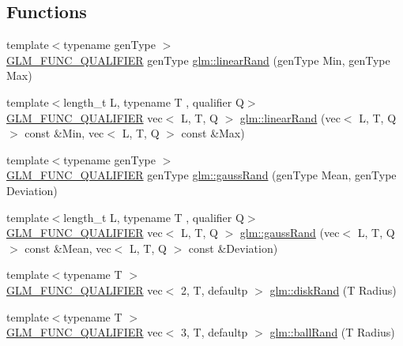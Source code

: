 \subsection*{Functions}
\begin{DoxyCompactItemize}
\item 
{\footnotesize template$<$typename gen\+Type $>$ }\\\hyperlink{setup_8hpp_a33fdea6f91c5f834105f7415e2a64407}{G\+L\+M\+\_\+\+F\+U\+N\+C\+\_\+\+Q\+U\+A\+L\+I\+F\+I\+ER} gen\+Type \hyperlink{group__gtc__random_ga04e241ab88374a477a2c2ceadd2fa03d}{glm\+::linear\+Rand} (gen\+Type Min, gen\+Type Max)
\item 
{\footnotesize template$<$length\+\_\+t L, typename T , qualifier Q$>$ }\\\hyperlink{setup_8hpp_a33fdea6f91c5f834105f7415e2a64407}{G\+L\+M\+\_\+\+F\+U\+N\+C\+\_\+\+Q\+U\+A\+L\+I\+F\+I\+ER} vec$<$ L, T, Q $>$ \hyperlink{group__gtc__random_ga94731130c298a9ff5e5025fdee6d97a0}{glm\+::linear\+Rand} (vec$<$ L, T, Q $>$ const \&Min, vec$<$ L, T, Q $>$ const \&Max)
\item 
{\footnotesize template$<$typename gen\+Type $>$ }\\\hyperlink{setup_8hpp_a33fdea6f91c5f834105f7415e2a64407}{G\+L\+M\+\_\+\+F\+U\+N\+C\+\_\+\+Q\+U\+A\+L\+I\+F\+I\+ER} gen\+Type \hyperlink{group__gtc__random_ga5193a83e49e4fdc5652c084711083574}{glm\+::gauss\+Rand} (gen\+Type Mean, gen\+Type Deviation)
\item 
{\footnotesize template$<$length\+\_\+t L, typename T , qualifier Q$>$ }\\\hyperlink{setup_8hpp_a33fdea6f91c5f834105f7415e2a64407}{G\+L\+M\+\_\+\+F\+U\+N\+C\+\_\+\+Q\+U\+A\+L\+I\+F\+I\+ER} vec$<$ L, T, Q $>$ \hyperlink{namespaceglm_a6335eb662ef1aad00727b8dea15adb0e}{glm\+::gauss\+Rand} (vec$<$ L, T, Q $>$ const \&Mean, vec$<$ L, T, Q $>$ const \&Deviation)
\item 
{\footnotesize template$<$typename T $>$ }\\\hyperlink{setup_8hpp_a33fdea6f91c5f834105f7415e2a64407}{G\+L\+M\+\_\+\+F\+U\+N\+C\+\_\+\+Q\+U\+A\+L\+I\+F\+I\+ER} vec$<$ 2, T, defaultp $>$ \hyperlink{group__gtc__random_gaa0b18071f3f97dbf8bcf6f53c6fe5f73}{glm\+::disk\+Rand} (T Radius)
\item 
{\footnotesize template$<$typename T $>$ }\\\hyperlink{setup_8hpp_a33fdea6f91c5f834105f7415e2a64407}{G\+L\+M\+\_\+\+F\+U\+N\+C\+\_\+\+Q\+U\+A\+L\+I\+F\+I\+ER} vec$<$ 3, T, defaultp $>$ \hyperlink{group__gtc__random_ga7c53b7797f3147af68a11c767679fa3f}{glm\+::ball\+Rand} (T Radius)

\end{DoxyCompactItemize}
